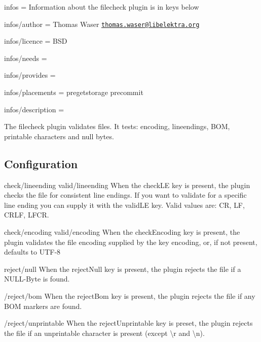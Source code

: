 
\begin{DoxyItemize}
\item infos = Information about the filecheck plugin is in keys below
\item infos/author = Thomas Waser \href{mailto:thomas.waser@libelektra.org}{\tt thomas.\+waser@libelektra.\+org}
\item infos/licence = B\+S\+D
\item infos/needs =
\item infos/provides =
\item infos/placements = pregetstorage precommit
\item infos/description =
\end{DoxyItemize}

The filecheck plugin validates files. It tests\+: encoding, lineendings, B\+O\+M, printable characters and null bytes.

\subsection*{Configuration}

{\ttfamily check/lineending} {\ttfamily valid/lineending} When the {\ttfamily check\+L\+E} key is present, the plugin checks the file for consistent line endings. If you want to validate for a specific line ending you can supply it with the {\ttfamily valid\+L\+E} key. Valid values are\+: {\ttfamily C\+R}, {\ttfamily L\+F}, {\ttfamily C\+R\+L\+F}, {\ttfamily L\+F\+C\+R}.

{\ttfamily check/encoding} {\ttfamily valid/encoding} When the {\ttfamily check\+Encoding} key is present, the plugin validates the file encoding supplied by the key {\ttfamily encoding}, or, if not present, defaults to {\ttfamily U\+T\+F-\/8}

{\ttfamily reject/null} When the {\ttfamily reject\+Null} key is present, the plugin rejects the file if a N\+U\+L\+L-\/\+Byte is found.

{\ttfamily /reject/bom} When the {\ttfamily reject\+Bom} key is present, the plugin rejects the file if any B\+O\+M markers are found.

{\ttfamily /reject/unprintable} When the {\ttfamily reject\+Unprintable} key is preset, the plugin rejects the file if an unprintable character is present (except {\ttfamily \textbackslash{}r} and {\ttfamily \textbackslash{}n}). 